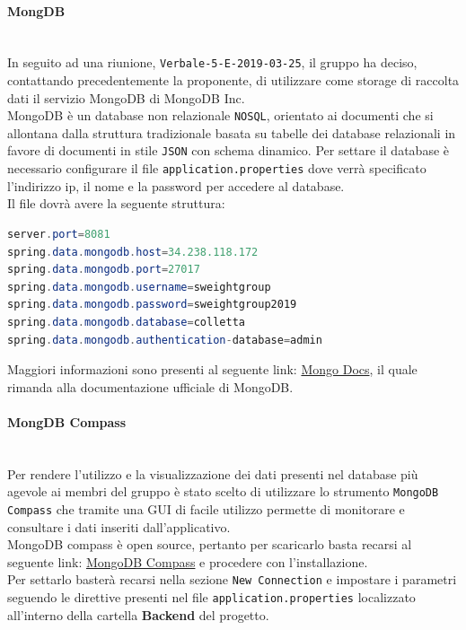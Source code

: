 \paragraph{MongDB}\mbox{}\\
In seguito ad una riunione, \texttt{Verbale-5-E-2019-03-25}, il gruppo ha deciso, contattando precedentemente la proponente, di utilizzare come storage di raccolta dati il servizio MongoDB di MongoDB Inc.\\
MongoDB è un database non relazionale \texttt{NOSQL}, orientato ai documenti che si allontana dalla struttura tradizionale basata su tabelle dei database relazionali in favore di documenti in stile \texttt{JSON} con schema dinamico. 
Per settare il database è necessario configurare il file \texttt{application.properties} dove verrà specificato l'indirizzo ip, il nome e la password per accedere al database.\\
Il file dovrà avere la seguente struttura: 
\begin{lstlisting}[language=Java] 
server.port=8081
spring.data.mongodb.host=34.238.118.172
spring.data.mongodb.port=27017
spring.data.mongodb.username=sweightgroup
spring.data.mongodb.password=sweightgroup2019
spring.data.mongodb.database=colletta
spring.data.mongodb.authentication-database=admin
\end{lstlisting}
Maggiori informazioni sono presenti al seguente link: \href{https://docs.mongodb.com/?_ga=2.183391522.509639120.1554133474-1194492321.1550924275}{Mongo Docs}, il quale rimanda alla documentazione ufficiale di MongoDB. 

\paragraph{MongDB Compass}\mbox{}\\
Per rendere l'utilizzo e la visualizzazione dei dati presenti nel database più agevole ai membri del gruppo è stato scelto di utilizzare lo strumento \texttt{MongoDB Compass} che tramite una {GUI} di facile utilizzo permette di monitorare e consultare i dati inseriti dall'applicativo.\\
MongoDB compass è open source, pertanto per scaricarlo basta recarsi al seguente link: \href{https://www.mongodb.com/products/compass}{MongoDB Compass} e procedere con l'installazione.\\
Per settarlo basterà recarsi nella sezione \texttt{New  Connection} e impostare i parametri seguendo le direttive presenti nel file \texttt{application.properties} localizzato all'interno della cartella \textbf{Backend} del progetto.

